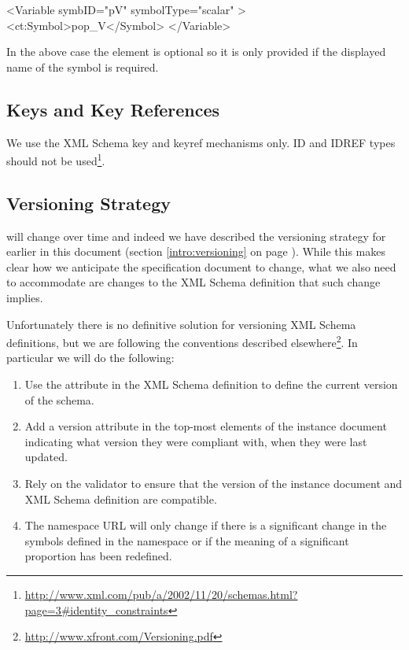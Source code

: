 \begin{xmlcode}
<Variable symbID="pV" symbolType="scalar" >
  <ct:Symbol>pop_V</Symbol>
</Variable>
\end{xmlcode}

In the above case the  element is optional so it is
only provided if the displayed name of the symbol is
required.

\subsection{Keys and Key References}

We use the XML Schema key and keyref mechanisms only. ID and IDREF
types should not be used\footnote{\url{http://www.xml.com/pub/a/2002/11/20/schemas.html?page=3\#identity_constraints}}.

\subsection{Versioning Strategy}

\pharmml will change over time and indeed we have described the
versioning strategy for \pharmml earlier in this document (section
\ref{intro:versioning} on page \pageref{intro:versioning}). While this
makes clear how we anticipate the specification document to change,
what we also need to accommodate are changes to the XML Schema
definition that such change implies.

Unfortunately there is no definitive solution for versioning XML
Schema definitions, but we are following the conventions described
elsewhere\footnote{\url{http://www.xfront.com/Versioning.pdf}}. In particular we
will do the following:
\begin{enumerate}
\item Use the  attribute in the XML Schema definition to
  define the current version of the schema.
\item Add a version attribute in the top-most elements of the instance
  document indicating what version they were compliant with, when they
  were last updated.
\item Rely on the \pharmml validator to ensure that the version of the
  instance document and XML Schema definition are compatible.
\item The namespace URL will only change if there is a significant
  change in the symbols defined in the namespace or if the meaning of
  a significant proportion has been redefined.
\end{enumerate}

